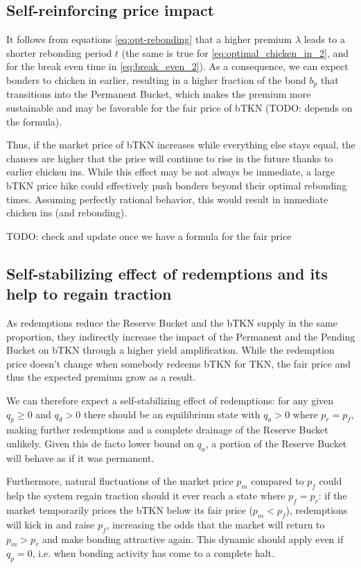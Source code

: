 \documentclass{article}
\begin{document}
\subsection{Self-reinforcing price impact}
It follows from equations \ref{eq:opt-rebonding} that a higher premium $\lambda$ leads to a shorter rebonding period $t$ (the same is true for \ref{eq:optimal_chicken_in_2}, and for the break even time in \ref{eq:break_even_2}). As a consequence, we can expect bonders to chicken in earlier, resulting in a higher fraction of the bond $b_p$ that transitions into the Permanent Bucket, which makes the premium more sustainable and may be favorable for the fair price of bTKN (TODO: depends on the formula).

Thus, if the market price of bTKN increases while everything else stays equal, the chances are higher that the price will continue to rise in the future thanks to earlier chicken ins. While this effect may be not always be immediate, a large bTKN price hike could effectively push bonders beyond their optimal rebonding times.
Assuming perfectly rational behavior, this would result in immediate chicken ins (and rebonding).

TODO: check and update once we have a formula for the fair price

\subsection{Self-stabilizing effect of redemptions and its help to regain traction}
  \label{sec:self-stabilizing}
As redemptions reduce the Reserve Bucket and the bTKN supply in the same proportion, they indirectly increase the impact of the Permanent and the Pending Bucket on bTKN through a higher yield amplification. While the redemption price doesn't change when somebody redeems bTKN for TKN, the fair price and thus the expected premium grow as a result. 

We can therefore expect a self-stabilizing effect of redemptions: for any given $q_p \geq 0$ and $q_d > 0$ there should be an equilibrium state with $q_a > 0$ where $p_r = p_f$, making further redemptions and a complete drainage of the Reserve Bucket unlikely. Given this de facto lower bound on $q_a$, a portion of the Reserve Bucket will behave as if it was permanent.

Furthermore, natural fluctuations of the market price $p_m$ compared to $p_f$ could help the system regain traction should it ever reach a state where $p_f = p_r$: if the market temporarily prices the bTKN below its fair price ($p_m < p_f$), redemptions will kick in and raise $p_f$, increasing the odds that the market will return to $p_m > p_r$ and make bonding attractive again. This dynamic should apply even if $q_p = 0$, i.e. when bonding activity has come to a complete halt.
\end{document}
